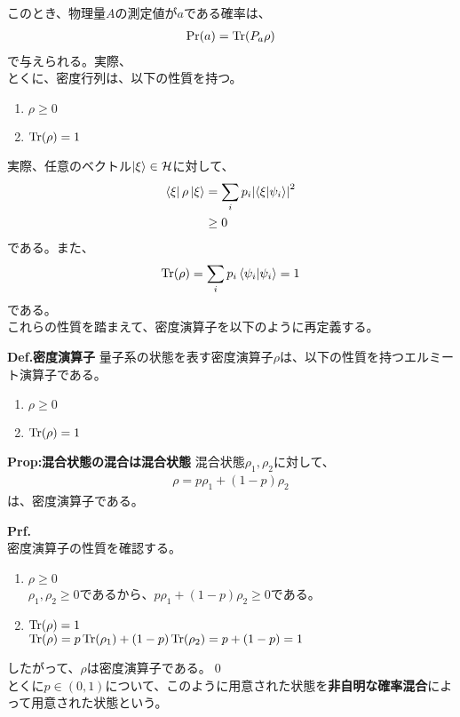 \documentclass[a4paper,11pt]{jsarticle}
\numberwithin{equation}{section}
\begin{document}
このとき、物理量$A$の測定値が$a$である確率は、
\begin{align}
    \Pr(a) = \Tr(P_a\rho)
\end{align}
で与えられる。実際、\\
とくに、密度行列は、以下の性質を持つ。
\begin{enumerate}
    \item $\rho \geq 0$ 
    \item $\Tr(\rho) = 1$ 
\end{enumerate}
実際、任意のベクトル$\ket{\xi} \in \mathcal{H}$に対して、
\begin{align}
    \bra{\xi}\rho\ket{\xi} &= \sum_i p_i\abs{\braket{\xi}{\psi_i}}^2\\
    &\geq 0
\end{align}
である。また、
\begin{align}
    \Tr(\rho) = \sum_i p_i\braket{\psi_i}{\psi_i} = 1
\end{align}
である。\\
これらの性質を踏まえて、密度演算子を以下のように再定義する。

\begin{itembox}[l]{\textbf{Def.密度演算子}}
    量子系の状態を表す密度演算子$\rho$は、以下の性質を持つエルミート演算子である。
    \begin{enumerate}
        \item $\rho \geq 0$
        \item $\Tr(\rho) = 1$
    \end{enumerate}
\end{itembox}

\begin{itembox}[l]{\textbf{Prop:混合状態の混合は混合状態}}
    混合状態$\rho_1, \rho_2$に対して、
    \begin{align}
        \rho = p\rho_1 + (1-p)\rho_2
    \end{align}
    は、密度演算子である。
\end{itembox}
\textbf{Prf.}\\
密度演算子の性質を確認する。
\begin{enumerate}
    \item $\rho \geq 0$\\
    $\rho_1, \rho_2 \geq 0$であるから、$p\rho_1 + (1-p)\rho_2 \geq 0$である。
    \item $\Tr(\rho) = 1$\\
    $\Tr(\rho) = p\Tr(\rho_1) + (1-p)\Tr(\rho_2) = p + (1-p) = 1$
\end{enumerate}
したがって、$\rho$は密度演算子である。\qed\\
とくに$p \in(0,1)$について、このように用意された状態を\textbf{非自明な確率混合}によって用意された状態という。\\
\end{document}
